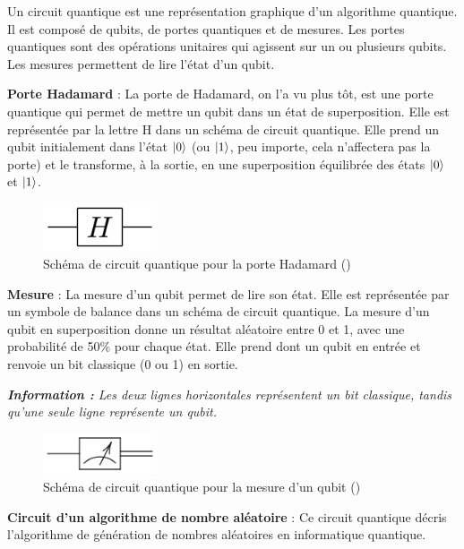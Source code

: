 \documentclass{article}
\begin{document}
Un circuit quantique est une représentation graphique d'un algorithme quantique. Il est composé
de qubits, de portes quantiques et de mesures. Les portes quantiques sont des opérations
unitaires qui agissent sur un ou plusieurs qubits. Les mesures permettent de lire l'état d'un qubit.

\textbf{Porte Hadamard} :
La porte de Hadamard, on l'a vu plus tôt, est une porte quantique qui permet de mettre un qubit
dans un état de superposition. Elle est représentée par la lettre H dans un schéma de circuit
quantique. Elle prend un qubit initialement dans l'état $\ket{0}$ (ou $\ket{1}$, peu importe, cela n'affectera pas la porte) et le transforme, à la sortie, en une superposition
équilibrée des états $\ket{0}$ et $\ket{1}$.

\begin{figure}[H]
  \centering
  \includegraphics[width=0.3\textwidth]{img/hadamard.png}
  \caption{Schéma de circuit quantique pour la porte Hadamard (\cite{wikipediaPorteQuantique})}
\end{figure}

\textbf{Mesure} :
La mesure d'un qubit permet de lire son état. Elle est représentée par un symbole de balance dans
un schéma de circuit quantique. La mesure d'un qubit en superposition donne un résultat aléatoire
entre 0 et 1, avec une probabilité de 50\% pour chaque état. Elle prend dont un qubit en entrée et
renvoie un bit classique (0 ou 1) en sortie.

\textit{\textbf{Information :} Les deux lignes horizontales représentent un bit classique, tandis qu'une seule ligne représente un qubit.}

\begin{figure}[H]
  \centering
  \includegraphics[width=0.3\textwidth]{img/mesure.png}
  \caption{Schéma de circuit quantique pour la mesure d'un qubit (\cite{wikipediaPorteQuantique})}
\end{figure}

\textbf{Circuit d'un algorithme de nombre aléatoire} :
Ce circuit quantique décris l'algorithme de génération de nombres aléatoires en informatique quantique. 
\end{document}
